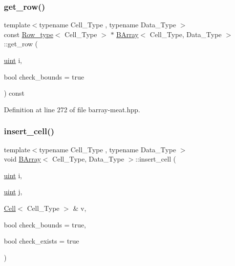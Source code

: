 \subsubsection{\texorpdfstring{get\+\_\+row()}{get\_row()}}
{\footnotesize\ttfamily template$<$typename Cell\+\_\+\+Type , typename Data\+\_\+\+Type $>$ \\
const \hyperlink{typedefs_8hpp_a83d6ee40a2ba22844108bb8b82e9b951}{Row\+\_\+type}$<$ Cell\+\_\+\+Type $>$ $\ast$ \hyperlink{class_b_array}{B\+Array}$<$ Cell\+\_\+\+Type, Data\+\_\+\+Type $>$\+::get\+\_\+row (\begin{DoxyParamCaption}\item[{\hyperlink{typedefs_8hpp_a91ad9478d81a7aaf2593e8d9c3d06a14}{uint}}]{i,  }\item[{bool}]{check\+\_\+bounds = {\ttfamily true} }\end{DoxyParamCaption}) const\hspace{0.3cm}{\ttfamily [inline]}}



Definition at line 272 of file barray-\/meat.\+hpp.

\mbox{\label{class_b_array_a098b5214df6790a5b4aaf3e0f7c1473a}} 
\subsubsection{\texorpdfstring{insert\+\_\+cell()}{insert\_cell()}\hspace{0.1cm}{\footnotesize\ttfamily [1/10]}}
{\footnotesize\ttfamily template$<$typename Cell\+\_\+\+Type , typename Data\+\_\+\+Type $>$ \\
void \hyperlink{class_b_array}{B\+Array}$<$ Cell\+\_\+\+Type, Data\+\_\+\+Type $>$\+::insert\+\_\+cell (\begin{DoxyParamCaption}\item[{\hyperlink{typedefs_8hpp_a91ad9478d81a7aaf2593e8d9c3d06a14}{uint}}]{i,  }\item[{\hyperlink{typedefs_8hpp_a91ad9478d81a7aaf2593e8d9c3d06a14}{uint}}]{j,  }\item[{\hyperlink{class_cell}{Cell}$<$ Cell\+\_\+\+Type $>$ \&}]{v,  }\item[{bool}]{check\+\_\+bounds = {\ttfamily true},  }\item[{bool}]{check\+\_\+exists = {\ttfamily true} }\end{DoxyParamCaption})\hspace{0.3cm}{\ttfamily [inline]}}



